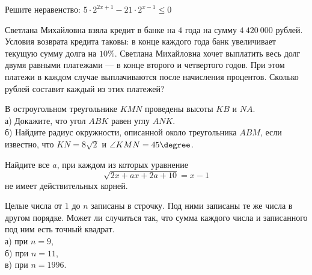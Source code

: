 \begin{training}[1]
\begin{listofex}[resume]
		\item Решите неравенство: \( 5\cdot2^{2x+1}-21\cdot2^{x-1}\le0 \)
		\item Светлана Михайловна взяла кредит в банке на \( 4 \) года на сумму \( 4\: 420\: 000 \) рублей. Условия возврата кредита таковы: в конце каждого года банк увеличивает текущую сумму долга на \( 10\% \). Светлана Михайловна хочет выплатить весь долг двумя равными платежами --- в конце второго и четвертого годов. При этом платежи в каждом случае выплачиваются после начисления процентов. Сколько рублей составит каждый из этих платежей?
		\item В остроугольном треугольнике \( KMN \) проведены высоты \( KB \) и \( NA \).\\
		а)  Докажите, что угол \( ABK \) равен углу \( ANK \).	\\
		б)  Найдите радиус окружности, описанной около треугольника \( ABM \), если известно, что \( KN=8\sqrt{2} \) и \( \angle KMN=45\degree \).
		\item Найдите все \( a \), при каждом из которых уравнение 
		\[ \sqrt{2x+ax+2a+10}=x-1 \]
		не имеет действительных корней.
		\item Целые числа от \( 1 \) до \( n \) записаны в строчку. Под ними записаны те же числа в другом порядке. Может ли случиться так, что сумма каждого числа и записанного под ним есть точный квадрат.\\
		а)  при \( n=9 \),\\		
		б)  при \( n=11 \),\\		
		в)  при \( n=1996 \).
	\end{listofex}
\end{training}

